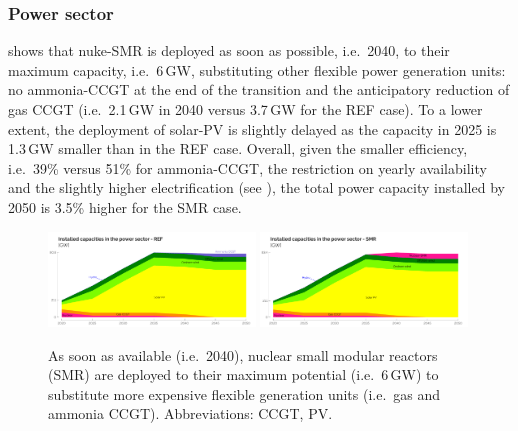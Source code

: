 \documentclass[11pt,twoside,a4paper,english]{article}
\def\ie{i.e.\ }
\begin{document}
\subsubsection{Power sector}
\label{subsubsec:results_deter_power_sector}
 shows that \gls{nuke-SMR} is deployed as soon as possible, \ie 2040, to their maximum capacity, \ie 6\,GW, substituting other flexible power generation units: no ammonia-\gls{CCGT} at the end of the transition and the anticipatory reduction of gas \gls{CCGT} (\ie 2.1\,GW in 2040 versus 3.7\,GW for the REF case). To a lower extent, the deployment of solar-\gls{PV} is slightly delayed as the capacity in 2025 is 1.3\,GW smaller than in the REF case. Overall, given the smaller efficiency, \ie 39\% versus 51\% for ammonia-\gls{CCGT}, the restriction on yearly availability and the slightly higher electrification (see ), the total power capacity installed by 2050 is 3.5\% higher for the SMR case.
\begin{figure}[!htbp]
\centering
\includegraphics[width=0.49\textwidth]{figures/Elec_Tech_Cap_REF.pdf}
\includegraphics[width=0.49\textwidth]{figures/Elec_Tech_Cap_SMR.pdf}
\caption{As soon as available (\ie 2040), nuclear small modular reactors (SMR) are deployed to their maximum potential (\ie 6\,GW) to substitute more expensive flexible generation units (\ie gas and ammonia \gls{CCGT}). Abbreviations: \acrfull{CCGT}, \acrfull{PV}.}
\label{fig:results_deter_tech_cap_elec}
\end{figure}
\end{document}
